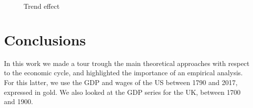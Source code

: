 \documentclass[a4paper]{article}
\begin{document}
\begin{figure}[H]
	\centering
	\caption{Trend effect} \label{fig:espect_tendencias}

\end{figure}

\section{Conclusions}

In this work we made a tour trough the main theoretical approaches with respect to the economic cycle, and highlighted the importance of an empirical analysis. For this latter, we use the GDP and wages of the US between 1790 and 2017, expressed in gold. We also looked at the GDP series for the UK, between 1700 and 1900.
\end{document}
